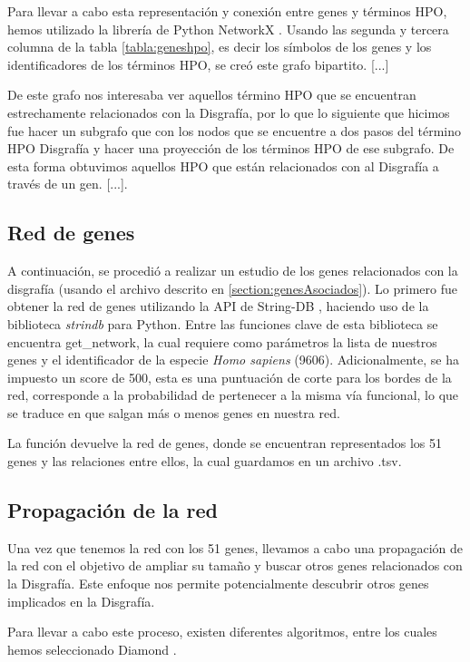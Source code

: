 Para llevar a cabo esta representación y conexión entre genes y términos HPO, hemos utilizado la librería de Python NetworkX \cite{BookNetworkX}. Usando las segunda y tercera columna de la tabla \ref{tabla:geneshpo}, es decir los símbolos de los genes y los identificadores de los términos HPO, se creó este grafo bipartito. [...]

De este grafo nos interesaba ver aquellos término HPO que se encuentran estrechamente relacionados con la Disgrafía, por lo que lo siguiente que hicimos fue hacer un subgrafo que con los nodos que se encuentre a dos pasos del término HPO Disgrafía y hacer una proyección de los términos HPO de ese subgrafo. De esta forma obtuvimos aquellos HPO que están relacionados con al Disgrafía a través de un gen. [...].

\subsection{Red de genes}

A continuación, se procedió a realizar un estudio de los genes relacionados con la disgrafía (usando el archivo descrito en \ref{section:genesAsociados}). Lo primero fue obtener la red de genes utilizando la API de String-DB \cite{String2021}, haciendo uso de la biblioteca \textit{strindb} para Python. Entre las funciones clave de esta biblioteca se encuentra get\_network, la cual requiere como parámetros la lista de nuestros genes y el identificador de la especie \textit{Homo sapiens} (9606). Adicionalmente, se ha impuesto un score de 500, esta es una puntuación de corte para los bordes de la red, corresponde a la probabilidad de pertenecer a la misma vía funcional, lo que se traduce en que salgan más o menos genes en nuestra red.

La función devuelve la red de genes, donde se encuentran representados los 51 genes y las relaciones entre ellos, la cual guardamos en un archivo .tsv.


\subsection{Propagación de la red}

Una vez que tenemos la red con los 51 genes, llevamos a cabo una propagación de la red con el objetivo de ampliar su tamaño y buscar otros genes relacionados con la Disgrafía. Este enfoque nos permite potencialmente descubrir otros genes implicados en la Disgrafía.

Para llevar a cabo este proceso, existen diferentes algoritmos, entre los cuales hemos seleccionado Diamond \cite{Diamond2015}.

